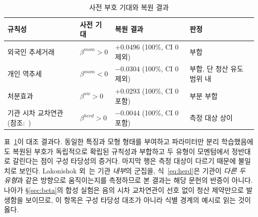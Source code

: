 \begin{table}[t]
  \caption{사전 부호 기대와 복원 결과}
  \label{tab:construct}
  \small
  \begin{tabular}{@{}>{\raggedright\arraybackslash}p{}
                  >{\raggedright\arraybackslash}p{}
                  >{\raggedright\arraybackslash}p{}
                  >{\raggedright\arraybackslash}p{}@{}}
    \toprule
    규칙성 & 사전 기대 & 복원 결과 & 판정 \\
    \midrule
    외국인 추세거래~\cite{grinblatt2000investment,choe1999foreign}
      & $\beta^{mom}\!>\!0$ & $+0.0496$ (100\%, CI 0 제외) & 부합 \\
    개인 역추세~\cite{grinblatt2000investment,kaniel2008individual}
      & $\beta^{mom}\!<\!0$ & $-0.0304$ (100\%, CI 0 제외) & 부합, 단 청산 유도 범위 내 \\
    처분효과~\cite{shefrin1985disposition,odean1998investors}
      & $\beta^{uw}\!>\!0$ & $+0.0293$ (100\%, CI 0 포함) & 부분 부합 \\
    기관 시차 교차연관 (참조:~\cite{lakonishok1992impact})
      & $\beta^{herd}\!>\!0$ & $-0.0044$ (100\%, CI 0 포함) & 측정 대상 상이 \\
    \bottomrule
  \end{tabular}
\end{table}

표~\ref{tab:construct}이 대조 결과다. 동일한 특징과 모형 형태를 부여하고 파라미터만
분리 학습했음에도 복원된 부호가 독립적으로 확립된 규칙성과 부합하고 두 유형이
모멘텀에서 정반대로 갈린다는 점이 구성 타당성의 증거다. 마지막 행은 측정 대상이
다르기 때문에 불일치로 보인다. Lakonishok 외~\cite{lakonishok1992impact}는 기관
\emph{내부}의 군집을, 식~\eqref{eq:herd}은 기관이 \emph{다른 두 유형}과 같은 방향으로
움직이는지를 측정하므로 본 결과는 해당 문헌의 반증이 아니다. 나아가
\S\ref{sec:beta}의 합성 실험은 음의 시차 교차연관이 선호 없이 청산 제약만으로
발생함을 보이므로, 이 항목은 구성 타당성 대조가 아니라 식별 경계의 예시로 읽는 것이
옳다.
